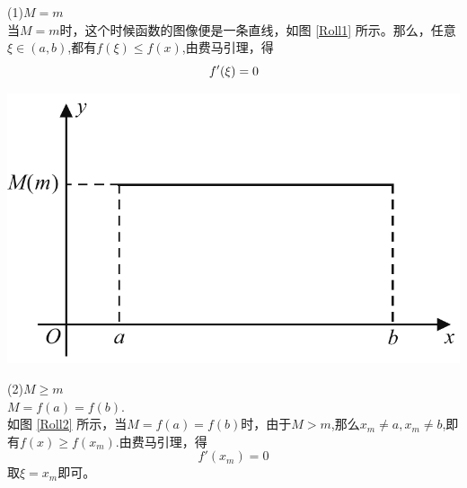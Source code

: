 \begin{minipage}{0.5\linewidth}
	(1)\enspace $M=m$\\
\kg 当$M=m$时，这个时候函数的图像便是一条直线，如图 \ref{Roll1} 所示。那么，任意$\xi \in(a,b)$,都有$f(\xi)\leq f(x)$,由费马引理，得
\begin{equation}
\nonumber
f'(\xi)=0\sj
\end{equation}
\end{minipage}
\begin{minipage}{0.5\linewidth}
	\centering
	\includegraphics[width = 0.9\linewidth]{pic/C-2/Roll_1}
	\vspace*{-1em}
	\label{Roll1}
\end{minipage}


(2)\enspace$M\geq m $\\
\noindent {} $M=f(a)=f(b)$.\\
\kg 如图 \ref{Roll2} 所示，当$M=f(a)=f(b)$时，由于$M>m$,那么$x_m\neq a,x_m\neq b$,即有$f(x)\geq f(x_m)$.由费马引理，得
\begin{equation}
	\nonumber
	f'(x_m)=0
\end{equation}
取$\xi=x_m$即可。

